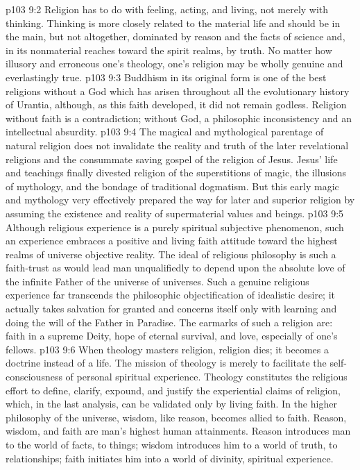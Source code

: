\vs p103 9:2 Religion has to do with feeling, acting, and living, not merely with thinking. Thinking is more closely related to the material life and should be in the main, but not altogether, dominated by reason and the facts of science and, in its nonmaterial reaches toward the spirit realms, by truth. No matter how illusory and erroneous one’s theology, one’s religion may be wholly genuine and everlastingly true.
\vs p103 9:3 Buddhism in its original form is one of the best religions without a God which has arisen throughout all the evolutionary history of Urantia, although, as this faith developed, it did not remain godless. Religion without faith is a contradiction; without God, a philosophic inconsistency and an intellectual absurdity.
\vs p103 9:4 The magical and mythological parentage of natural religion does not invalidate the reality and truth of the later revelational religions and the consummate saving gospel of the religion of Jesus. Jesus’ life and teachings finally divested religion of the superstitions of magic, the illusions of mythology, and the bondage of traditional dogmatism. But this early magic and mythology very effectively prepared the way for later and superior religion by assuming the existence and reality of supermaterial values and beings.
\vs p103 9:5 Although religious experience is a purely spiritual subjective phenomenon, such an experience embraces a positive and living faith attitude toward the highest realms of universe objective reality. The ideal of religious philosophy is such a faith\hyp{}trust as would lead man unqualifiedly to depend upon the absolute love of the infinite Father of the universe of universes. Such a genuine religious experience far transcends the philosophic objectification of idealistic desire; it actually takes salvation for granted and concerns itself only with learning and doing the will of the Father in Paradise. The earmarks of such a religion are: faith in a supreme Deity, hope of eternal survival, and love, especially of one’s fellows.
\pc \vs p103 9:6 When theology masters religion, religion dies; it becomes a doctrine instead of a life. The mission of theology is merely to facilitate the self\hyp{}consciousness of personal spiritual experience. Theology constitutes the religious effort to define, clarify, expound, and justify the experiential claims of religion, which, in the last analysis, can be validated only by living faith. In the higher philosophy of the universe, wisdom, like reason, becomes allied to faith. Reason, wisdom, and faith are man’s highest human attainments. Reason introduces man to the world of facts, to things; wisdom introduces him to a world of truth, to relationships; faith initiates him into a world of divinity, spiritual experience.
